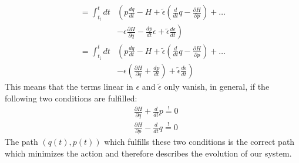 $$
\begin{aligned}
=\int_{t_{\mathrm{i}}}^{t} d t &\left(p \frac{d q}{d t}-H+\tilde{\epsilon}\left(\frac{d}{d t} q-\frac{\partial H}{\partial p}\right)+\ldots\right.\\
&\left.-\epsilon \frac{\partial H}{\partial q}-\frac{d p}{d t} \epsilon+\tilde{\epsilon} \frac{d \epsilon}{d t}\right) \\
=\int_{t_{\mathrm{i}}}^{t} d t &\left(p \frac{d q}{d t}-H+\tilde{\epsilon}\left(\frac{d}{d t} q-\frac{\partial H}{\partial p}\right)+\ldots\right.\\
&\left.-\epsilon\left(\frac{\partial H}{\partial q}+\frac{d p}{d t}\right)+\tilde{\epsilon} \frac{d \epsilon}{d t}\right)
\end{aligned}
$$
This means that the terms linear in $\epsilon$ and $\tilde{\epsilon}$ only vanish, in general, if the following two conditions are fulfilled:
\begin{equation}
\begin{aligned}
&\frac{\partial H}{\partial q}+\frac{d}{d t} p \stackrel{!}{=} 0\\
&\frac{\partial H}{\partial p}-\frac{d}{d t} q \stackrel{!}{=} 0
\end{aligned}
\end{equation}
The path $(q(t), p(t))$ which fulfills these two conditions is the correct path which minimizes the action and therefore describes the evolution of our system.

